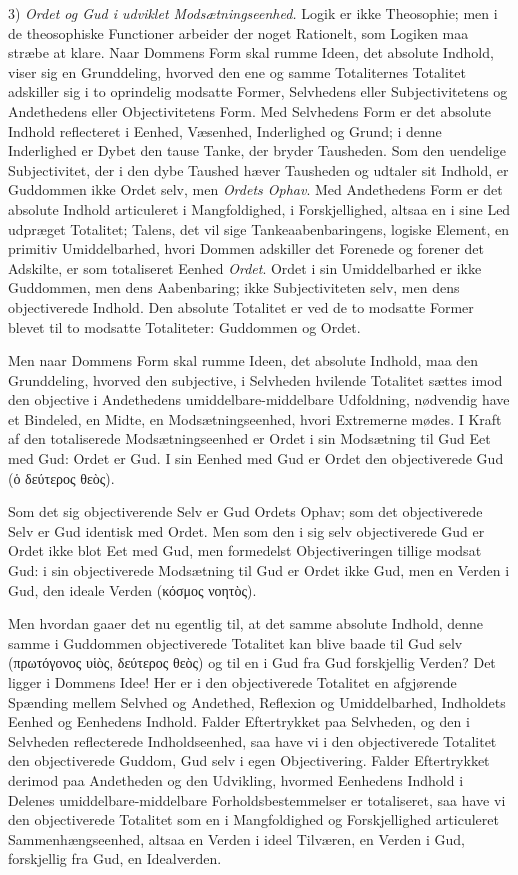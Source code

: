 \documentclass[12pt]{book}
\newcommand{\opage}[1]{\marginnote{\footnotesize\textit{[#1]}}}
\begin{document}
3) \emph{Ordet og Gud i udviklet Modsætningseenhed.}
Logik er ikke Theosophie; men i de theosophiske
Functioner arbeider der noget Rationelt, som Logiken maa
stræbe at klare. Naar Dommens Form skal rumme Ideen,
det absolute Indhold, viser sig en Grunddeling, hvorved den
\opage{93}ene og samme Totaliternes Totalitet adskiller sig i to oprindelig %
modsatte Former, Selvhedens eller Subjectivitetens
og Andethedens eller Objectivitetens Form. Med Selvhedens
Form er det absolute Indhold reflecteret i Eenhed,
Væsenhed, Inderlighed og Grund; i denne Inderlighed er
Dybet den tause Tanke, der bryder Tausheden. Som den
uendelige Subjectivitet, der i den dybe Taushed hæver Tausheden
og udtaler sit Indhold, er Guddommen ikke Ordet selv,
men \emph{Ordets Ophav}. Med Andethedens Form er det absolute
Indhold articuleret i Mangfoldighed, i Forskjellighed,
altsaa en i sine Led udpræget Totalitet; Talens, det vil sige
Tankeaabenbaringens, logiske Element, en primitiv Umiddelbarhed,
hvori Dommen adskiller det Forenede og forener det
Adskilte, er som totaliseret Eenhed \emph{Ordet}. Ordet i sin Umiddelbarhed
er ikke Guddommen, men dens Aabenbaring; ikke
Subjectiviteten selv, men dens objectiverede Indhold. Den
absolute Totalitet er ved de to modsatte Former blevet til to
modsatte Totaliteter: Guddommen og Ordet.

Men naar Dommens Form skal rumme Ideen, det absolute
Indhold, maa den Grunddeling, hvorved den subjective,
i Selvheden hvilende Totalitet sættes imod den objective i
Andethedens umiddelbare-middelbare Udfoldning, nødvendig
have et Bindeled, en Midte, en Modsætningseenhed, hvori
Extremerne mødes. I Kraft af den totaliserede Modsætningseenhed
er Ordet i sin Modsætning til Gud Eet med Gud:
Ordet er Gud. I sin Eenhed med Gud er Ordet den objectiverede
Gud (ὁ δεύτερος θεὸς).

Som det sig objectiverende Selv er Gud Ordets Ophav;
som det objectiverede Selv er Gud identisk med Ordet. Men
som den i sig selv objectiverede Gud er Ordet ikke blot Eet
med Gud, men formedelst Objectiveringen tillige modsat Gud:
i sin objectiverede Modsætning til Gud er Ordet ikke Gud,
men en Verden i Gud, den ideale Verden (κόσμος νοητὸς).

\opage{94}Men hvordan gaaer det nu egentlig til, at det samme
absolute Indhold, denne samme i Guddommen objectiverede
Totalitet kan blive baade til Gud selv (πρωτόγονος υἱὸς, δεύτερος
θεὸς) og til en i Gud fra Gud forskjellig Verden?
Det ligger i Dommens Idee! Her er i den objectiverede Totalitet
en afgjørende Spænding mellem Selvhed og Andethed,
Reflexion og Umiddelbarhed, Indholdets Eenhed og Eenhedens
Indhold. Falder Eftertrykket paa Selvheden, og den i Selvheden
reflecterede Indholdseenhed, saa have vi i den objectiverede
Totalitet den objectiverede Guddom, Gud selv i egen
Objectivering. Falder Eftertrykket derimod paa Andetheden
og den Udvikling, hvormed Eenhedens Indhold i Delenes
umiddelbare-middelbare Forholdsbestemmelser er totaliseret, saa
have vi den objectiverede Totalitet som en i Mangfoldighed
og Forskjellighed articuleret Sammenhængseenhed, altsaa en
Verden i ideel Tilværen, en Verden i Gud, forskjellig fra Gud,
en Idealverden.
\end{document}
